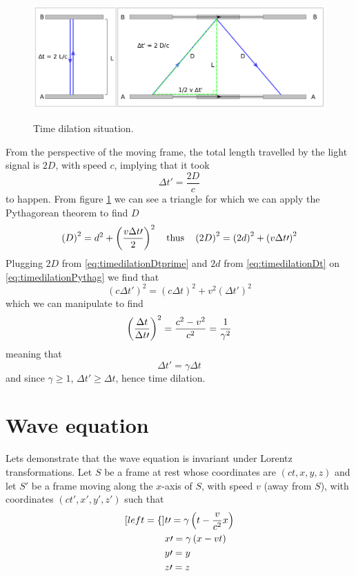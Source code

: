 \documentclass[oneside, 10pt, notitlepage]{book}
\begin{document}
\begin{figure}[t]
\caption{Time dilation situation.}
\centering
\includegraphics[width=\textwidth]{timedilation}
\label{fig:timedilation}
\end{figure}

From the perspective of the moving frame, the total length travelled by the light signal is \(2D\), with speed \(c\), implying that it took
\begin{equation}\label{eq:timedilationDtprime}
\Delta t{\prime}= \frac{2D}{c}
\end{equation}
to happen. From figure \ref{fig:timedilation} we can see a triangle for which we can apply the Pythagorean theorem to find \(D\)
\begin{equation}\label{eq:timedilationPythag}
\lr{D}^2 = d^2 + \lr{\frac{v \Delta t{\prime}}{2}}^2 \qq{thus} \lr{2D}^2 = \lr{2d}^2 + \lr{v \Delta t{\prime}}^2
\end{equation}
Plugging \(2D\) from \eqref{eq:timedilationDtprime} and \(2d\) from \eqref{eq:timedilationDt} on \eqref{eq:timedilationPythag} we find that
\begin{equation}(c\Delta t{\prime})^2 = (c \Delta t)^2 + v^2 (\Delta t{\prime})^2\end{equation}
which we can manipulate to find
\begin{equation}\left(\frac{\Delta t}{\Delta t{\prime}}\right)^2 = \frac{c^2 - v^2}{c^2} = \frac{1}{\gamma^2}\end{equation}
meaning that
\begin{equation}\Delta t{\prime} = \gamma \Delta t\end{equation}
and since \(\gamma \geq 1\), \(\Delta t{\prime} \geq \Delta t \), hence time dilation.  


\section{Wave equation}

Lets demonstrate that the wave equation is invariant under Lorentz transformations.  
Let \(S\) be a frame at rest whose coordinates are \((ct,x,y,z)\) and let \(S{\prime}\) be a frame moving along the \(x\)-axis of \(S\), with speed \(v\) (away from \(S\)), with coordinates \((ct{\prime},x{\prime},y{\prime},z{\prime})\) such that
\begin{subequations}
    \begin{align}[left = \empheqlbrace\,]
    & t{\prime} = \gamma\lr{t - \frac{v}{c^2} x} \\
	& x{\prime} = \gamma\lr{x - v t} \\
	& y{\prime} = y \\
	& z{\prime} = z
    \end{align}
\end{subequations}
\end{document}
